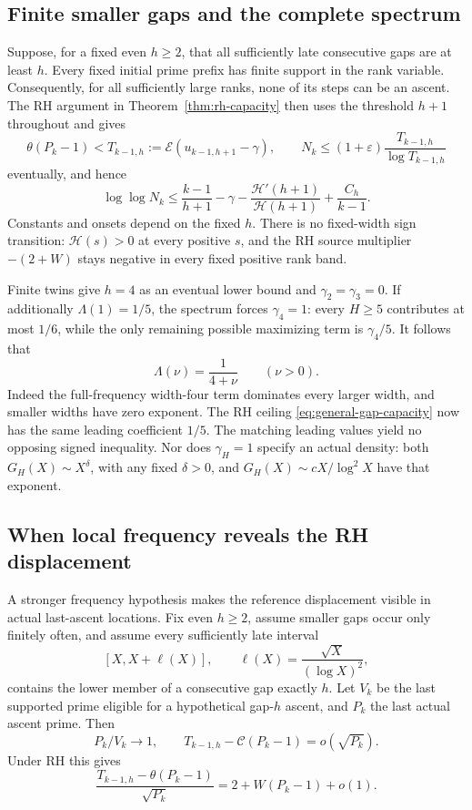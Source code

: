 \documentclass[11pt]{article}
\theoremstyle{definition}
\newcommand{\EE}{\mathcal E}
\begin{document}
\subsection{Finite smaller gaps and the complete spectrum}
Suppose, for a fixed even $h\ge2$, that all sufficiently late
consecutive gaps are at least $h$. Every fixed initial prime prefix
has finite support in the rank variable. Consequently, for all
sufficiently large ranks, none of its steps can be an ascent.
The RH argument in Theorem~\ref{thm:rh-capacity} then uses the
threshold $h+1$ throughout and gives
\[
 \theta(P_k-1)<T_{k-1,h}:=\EE(u_{k-1,h+1}-\gamma),\qquad
 N_k\le(1+\varepsilon)\frac{T_{k-1,h}}{\log T_{k-1,h}}
\]
eventually, and hence
\begin{equation}\label{eq:general-gap-capacity}
 \log\log N_k\le\frac{k-1}{h+1}-\gamma
 -\frac{\mathcal H'(h+1)}{\mathcal H(h+1)}+\frac{C_h}{k-1}.
\end{equation}
Constants and onsets depend on the fixed $h$. There is no fixed-width
sign transition: $\mathcal H(s)>0$ at every positive $s$, and the RH
source multiplier $-(2+W)$ stays negative in every fixed positive
rank band.

Finite twins give $h=4$ as an eventual lower bound and
$\gamma_2=\gamma_3=0$. If additionally $\Lambda(1)=1/5$, the spectrum
forces $\gamma_4=1$: every $H\ge5$ contributes at most $1/6$, while
the only remaining possible maximizing term is $\gamma_4/5$.
It follows that
\[
 \Lambda(\nu)=\frac1{4+\nu}\qquad(\nu>0).
\]
Indeed the full-frequency width-four term dominates every larger
width, and smaller widths have zero exponent.
The RH ceiling \eqref{eq:general-gap-capacity} now has the same
leading coefficient $1/5$. The matching leading values yield no
opposing signed inequality. Nor does $\gamma_H=1$ specify an actual
density: both $G_H(X)\sim X^\delta$, with any fixed $\delta>0$,
and $G_H(X)\sim cX/\log^2X$ have that exponent.

\subsection{When local frequency reveals the RH displacement}
A stronger frequency hypothesis makes the reference displacement
visible in actual last-ascent locations.
Fix even $h\ge2$, assume smaller gaps occur only finitely often, and
assume every sufficiently late interval
\[
 [X,X+\ell(X)],\qquad \ell(X)=\frac{\sqrt X}{(\log X)^2},
\]
contains the lower member of a consecutive gap exactly $h$.
Let $V_k$ be the last supported prime eligible for a hypothetical
gap-$h$ ascent, and $P_k$ the last actual ascent prime. Then
\begin{equation}\label{eq:local-tracking}
 P_k/V_k\longrightarrow1,\qquad
 T_{k-1,h}-\mathcal C(P_k-1)=o(\sqrt{P_k}).
\end{equation}
Under RH this gives
\[
 \frac{T_{k-1,h}-\theta(P_k-1)}{\sqrt{P_k}}
 =2+W(P_k-1)+o(1).
\]
\end{document}
